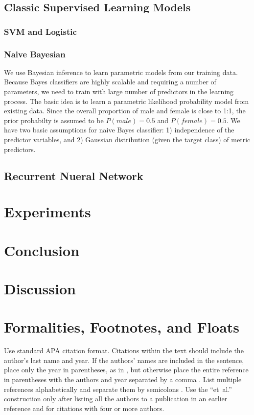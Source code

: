 \documentclass[10pt,letterpaper]{article}
\begin{document}
\subsection{Classic Supervised Learning Models}
\subsubsection{SVM and Logistic}

\subsubsection{Naive Bayesian}
We use Bayesian inference to learn parametric models from our training data. Because Bayes classifiers are highly scalable and requiring a number of parameters, we need to train with large number of predictors in the learning process.
The basic idea is to learn a parametric likelihood probability model from existing data. Since the overall proportion of male and female is close to 1:1, the prior probabilty is assumed to be $P(male) = 0.5$ and $P(female) = 0.5$. We have two basic assumptions for naive Bayes classifier: 1) independence of the predictor variables, and 2) Gaussian distribution (given the target class) of metric predictors. 
\subsection{Recurrent Nueral Network}

\section{Experiments}

\section{Conclusion}

\section{Discussion}

\section{Formalities, Footnotes, and Floats}

Use standard APA citation format. Citations within the text should
include the author's last name and year. If the authors' names are
included in the sentence, place only the year in parentheses, as in
, but otherwise place the entire reference in
parentheses with the authors and year separated by a comma
\cite{NewellSimon1972a}. List multiple references alphabetically and
separate them by semicolons
\cite{ChalnickBillman1988a,NewellSimon1972a}. Use the
``et~al.'' construction only after listing all the authors to a
publication in an earlier reference and for citations with four or
more authors.
\end{document}
